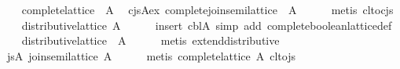 \begin{isabellebody}
\ \ \isamarkupfalse%
\ {}complete{}lattice\ {}{}\ A{}{}\ \isamarkupfalse%
\ cjs{}A{}ex{}\ {}complete{}join{}semilattice\ {}{}\ A{}{}\isanewline
\ \ \ \ \isamarkupfalse%
\ {}metis\ cl{}to{}cjs{}\isanewline
\ \ \isamarkupfalse%
\ {}distributive{}lattice\ A{}\isanewline
\ \ \ \ \isamarkupfalse%
\ {}insert\ cbl{}A{}\ simp\ add{}\ complete{}boolean{}lattice{}def{}\isanewline
\ \ \isamarkupfalse%
\ {}distributive{}lattice\ {}{}\ A{}{}\isanewline
\ \ \ \ \isamarkupfalse%
\ {}metis\ extend{}distributive{}\isanewline
\ \ \isamarkupfalse%
\ js{}A{}\ {}join{}semilattice\ A{}\isanewline
\ \ \ \ \isamarkupfalse%
\ {}metis\ {}complete{}lattice\ A{}\ cl{}to{}js{}\isanewline

\end{isabellebody}
